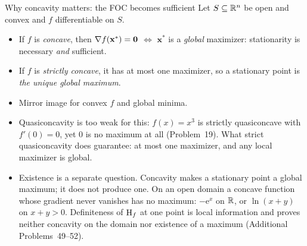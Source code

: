 \begin{gallery}
\hfill
{}\hfill
{}\hfill
{}
\end{gallery}

\begin{rulebox}{Why concavity matters: the FOC becomes sufficient}
Let $S\subseteq\mathbb{R}^{n}$ be open and convex and $f$ differentiable on $S$.
\begin{itemize}[leftmargin=1.6em,itemsep=0.3ex]
  \item If $f$ is \emph{concave}, then
        $\nabla f(\mathbf{x}^{*})=\mathbf{0}$ $\iff$ $\mathbf{x}^{*}$ is a
        \emph{global} maximizer: stationarity is necessary \emph{and}
        sufficient.
  \item If $f$ is \emph{strictly concave}, it has at most one maximizer,
        so a stationary point is \emph{the unique global maximum}.
  \item Mirror image for convex $f$ and global minima.
  \item Quasiconcavity is too weak for this: $f(x)=x^{3}$ is strictly
        quasiconcave with $f'(0)=0$, yet $0$ is no maximum at all
        (Problem~19). What strict quasiconcavity does guarantee: at most
        one maximizer, and any local maximizer is global.
  \item Existence is a separate question. Concavity makes a stationary
        point a global maximum; it does not produce one. On an open domain
        a concave function whose gradient never vanishes has no maximum:
        $-\mathrm{e}^{x}$ on $\mathbb{R}$, or $\ln(x+y)$ on $x+y>0$. Definiteness
        of $\operatorname{H}_f$ at one point is local information and proves neither
        concavity on the domain nor existence of a maximum (Additional
        Problems~49--52).
\end{itemize}
\end{rulebox}

